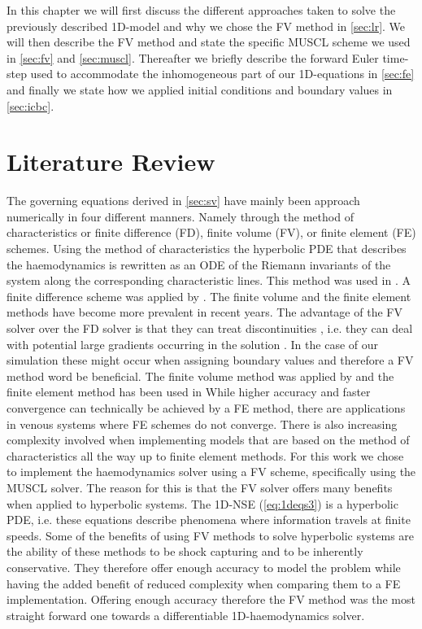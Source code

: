 \documentclass[a4paper, oneside]{discothesis}
\begin{document}
In this chapter we will first discuss the different approaches taken to solve the previously described 1D-model and why we chose the FV method in \autoref{sec:lr}.
We will then describe the FV method and state the specific MUSCL scheme we used in \autoref{sec:fv} and \autoref{sec:muscl}.
Thereafter we briefly describe the forward Euler time-step used to accommodate the inhomogeneous part of our 1D-equations in \autoref{sec:fe} and finally we state how we applied initial conditions and boundary values in \autoref{sec:icbc}.

\section{Literature Review} \label{sec:lr}
The governing equations derived in \autoref{sec:sv} have mainly been approach numerically in four different manners.
Namely through the method of characteristics or finite difference (FD), finite volume (FV), or finite element (FE) schemes.
Using the method of characteristics the hyperbolic PDE that describes the haemodynamics is rewritten as an ODE of the Riemann invariants of the system along the corresponding characteristic lines.
This method was used in \cite{streeter1963pulsatile,bodley1971non,parker1990forward,wang2004wave,wang2003time}.
A finite difference scheme was applied by \cite{smith2002anatomically,elad1991numerical,elad1991numerical,pontrelli2003numerical,reymond2009validation}.
The finite volume and the finite element methods have become more prevalent in recent years.
The advantage of the FV solver over the FD solver is that they can treat discontinuities \cite{toro2001shock}, i.e. they can deal with potential large gradients occurring in the solution \cite{shu1988efficient,harten1997uniformly}.
In the case of our simulation these might occur when assigning boundary values and therefore a FV method word be beneficial.
The finite volume method was applied by \cite{melis2017gaussian,brook1999numerical,brook2002model} and the finite element method has been used in \cite{sherwin2003one,sherwin2003computational,formaggia2001coupling,wan2002one,porenta1986finite,rooz1982finite,bessems2008experimental}
While higher accuracy and faster convergence can technically be achieved by a FE method, there are applications in venous systems where FE schemes do not converge.
There is also increasing complexity involved when implementing models that are based on the method of characteristics all the way up to finite element methods.
For this work we chose to implement the haemodynamics solver using a FV scheme, specifically using the MUSCL solver.
The reason for this is that the FV solver offers many benefits when applied to hyperbolic systems.
The 1D-NSE (\autoref{eq:1deqs3}) is a hyperbolic PDE, i.e. these equations describe phenomena where information travels at finite speeds. 
Some of the benefits of using FV methods to solve hyperbolic systems are the ability of these methods to be shock capturing and to be inherently conservative.
They therefore offer enough accuracy to model the problem while having the added benefit of reduced complexity when comparing them to a FE implementation.
Offering enough accuracy therefore the FV method was the most straight forward one towards a differentiable 1D-haemodynamics solver.
\end{document}
